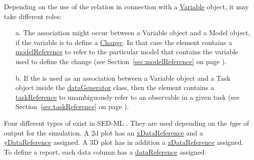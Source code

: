 Depending on the use of the  relation in connection with a \hyperref[class:variable]{Variable} object, it may take different roles: 
\begin{enumerate}
\item[a.]{The  association might occur between a Variable object and a Model object, if the variable is to define a \hyperref[class:change]{Change}. 
In that case the  element contains a \hyperref[sec:modelReference]{modelReference} to refer to the particular model that contains the variable used to define the change (see Section~\ref{sec:modelReference} on page \pageref{sec:modelReference}). }
\item[b.]{If the  is used as an association between a Variable object and a Task object  inside the \hyperref[class:dataGenerator]{dataGenerator} class, then the  element contains a \hyperref[sec:taskReference]{taskReference} to unambiguously refer to an observable in a given task (see Section~\ref{sec:taskReference} on page \pageref{sec:taskReference}).}
\end{enumerate}

Four different types of  exist in SED-ML \LoneVone. They are used depending on the \emph{type} of output for the simulation. A 2d plot has an \hyperref[sec:xDataReference]{xDataReference} and a \hyperref[sec:yDataReference]{yDataReference} assigned. A 3D plot has in addition a \hyperref[sec:zDataReference]{zDataReference} assigned. To define a report, each data column has a \hyperref[sec:dataReference1]{dataReference} assigned.










